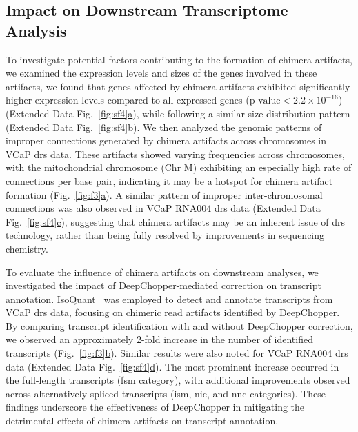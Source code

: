 \documentclass[pdflatex,sn-nature, lineno]{sn-jnl}%
\newcommand{\figref}[2]{Fig.~\hyperref[#1]{\ref*{#1}#2}}
\newcommand{\edfigref}[2]{Extended Data Fig.~\hyperref[#1]{\ref*{#1}#2}}
\begin{document}

\subsection{Impact on Downstream Transcriptome Analysis}

To investigate potential factors contributing to the formation of chimera artifacts, we examined the expression levels and sizes of the genes involved in these artifacts, we found that genes affected by chimera artifacts exhibited significantly higher expression levels compared to all expressed genes (\(\textrm{p-value} < 2.2 \times 10^{-16}\)) (\edfigref{fig:sf4}{a}), while following a similar size distribution pattern (\edfigref{fig:sf4}{b}).
We then analyzed the genomic patterns of improper connections generated by chimera artifacts across chromosomes in VCaP \gls{drs} data.
These artifacts showed varying frequencies across chromosomes, with the mitochondrial chromosome (Chr M) exhibiting an especially high rate of connections per base pair, indicating it may be a hotspot for chimera artifact formation (\figref{fig:f3}{a}).
A similar pattern of improper inter-chromosomal connections was also observed in VCaP RNA004 \gls{drs} data (\edfigref{fig:sf4}{c}), suggesting that chimera artifacts may be an inherent issue of \gls{drs} technology, rather than being fully resolved by improvements in sequencing chemistry.

To evaluate the influence of chimera artifacts on downstream analyses, we investigated the impact of DeepChopper-mediated correction on transcript annotation.
IsoQuant~\cite{prjibelski2023accurate} was employed to detect and annotate transcripts from VCaP \gls{drs} data, focusing on chimeric read artifacts identified by DeepChopper.
By comparing transcript identification with and without DeepChopper correction, we observed an approximately 2-fold increase in the number of identified transcripts (\figref{fig:f3}{b}).
Similar results were also noted for VCaP RNA004 \gls{drs} data (\edfigref{fig:sf4}{d}).
The most prominent increase occurred in the full-length transcripts (\gls{fsm} category), with additional improvements observed across alternatively spliced transcripts (\gls{ism}, \gls{nic}, and \gls{nnc} categories).
These findings underscore the effectiveness of DeepChopper in mitigating the detrimental effects of chimera artifacts on transcript annotation.
\end{document}

